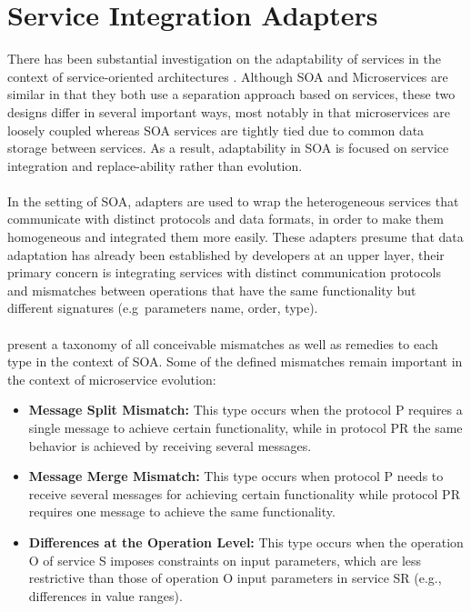 \section{Service Integration Adapters} %
\label{sec:service_integration_adapters}

There has been substantial investigation on the adaptability of services in the context of service-oriented architectures \cite{adaptersWebServices} .
Although SOA and Microservices are similar in that they both use a separation approach based on services,
these two designs differ in several important ways, most notably in that microservices are loosely coupled whereas SOA services are tightly tied due to common data storage between services.
As a result, adaptability in SOA is focused on service integration and replace-ability rather than evolution.

\paragraph{}

In the setting of SOA, adapters are used to wrap the heterogeneous services that communicate with distinct protocols and data formats,
in order to make them homogeneous and integrated them more easily.
These adapters presume that data adaptation has already been established by developers at an upper layer,
their primary concern is integrating services with distinct communication protocols and mismatches between operations that have the
same functionality but different signatures (e.g\ parameters name, order, type).

\paragraph{}

\citeauthor{adaptersWebServices} \cite{adaptersWebServices} present a taxonomy of all conceivable mismatches as well as remedies to each type in the context of SOA.
Some of the defined mismatches remain important in the context of microservice evolution:

\begin{itemize}
    \item \textbf{Message Split Mismatch:} This type occurs when the protocol P requires a single message to achieve certain functionality,
    while in protocol PR the same behavior is achieved by receiving several messages.
    \item \textbf{Message Merge Mismatch:} This type occurs when protocol P needs to receive several messages for achieving certain
    functionality while protocol PR requires one message to achieve the same functionality.
    \item \textbf{Differences at the Operation Level:} This type occurs when the operation O of service S imposes constraints on input parameters,
    which are less restrictive than those of operation O input parameters in service SR (e.g., differences in value ranges).
\end{itemize}

